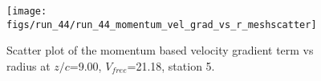 \begin{figure}[H]
\centering
\texttt{[image: figs/run\_44/run\_44\_momentum\_vel\_grad\_vs\_r\_meshscatter]}
\caption{Scatter plot of the momentum based velocity gradient term vs radius at $z/c$=9.00, $V_{free}$=21.18, station 5.}
\label{fig:run_44_momentum_vel_grad_vs_r_meshscatter}
\end{figure}


